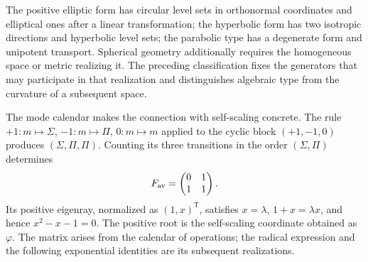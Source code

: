 The positive elliptic form has circular level sets in orthonormal
coordinates and elliptical ones after a linear transformation; the hyperbolic form
has two isotropic directions and hyperbolic level sets; the parabolic type
has a degenerate form and unipotent transport. Spherical geometry
additionally requires the homogeneous space or metric realizing it. The
preceding classification fixes the generators that may participate in that
realization and distinguishes algebraic type from the curvature of a
subsequent space.

The mode calendar makes the connection with self-scaling concrete. The rule
\(+1:m\mapsto\Sigma\), \(-1:m\mapsto\Pi\), \(0:m\mapsto m\)
applied to the cyclic block \((+1,-1,0)\) produces
\((\Sigma,\Pi,\Pi)\). Counting its three transitions in the order
\((\Sigma,\Pi)\) determines
\begin{equation}
 F_{\rm av}=\begin{pmatrix}0&1\\1&1\end{pmatrix}.
 \label{eq:geo-fav}
\end{equation}
Its positive eigenray, normalized as \((1,x)^\mathsf T\), satisfies
\(x=\lambda\), \(1+x=\lambda x\), and hence
\(x^2-x-1=0\). The positive root is the self-scaling coordinate obtained
as \(\varphi\). The matrix arises from the calendar of operations; the
radical expression and the following exponential identities are its
subsequent realizations.


